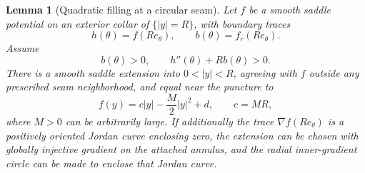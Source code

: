 \documentclass[11pt]{amsart}
\newtheorem{lemma}[theorem]{Lemma}
\theoremstyle{definition}
\theoremstyle{remark}
\numberwithin{equation}{section}
\begin{document}
\begin{lemma}[Quadratic filling at a circular seam]
\label{lem:quadratic-filling}
Let $f$ be a smooth saddle potential on an exterior collar of
$\{|y|=R\}$, with boundary traces
\[
 h(\theta)=f(Re_\theta),\qquad b(\theta)=f_r(Re_\theta).
\]
Assume
\begin{equation}\label{eq:radial-fill-data}
 b(\theta)>0,\qquad h''(\theta)+Rb(\theta)>0.
\end{equation}
There is a smooth saddle extension into $0<|y|<R$, agreeing with $f$
outside any prescribed seam neighborhood, and equal near the puncture to
\begin{equation}\label{eq:quadratic-germ}
 f(y)=c|y|-\frac M2|y|^2+d,\qquad c=MR,
\end{equation}
where $M>0$ can be arbitrarily large. If additionally the trace
$\nabla f(Re_\theta)$ is a positively oriented Jordan curve enclosing
zero, the extension can be chosen with globally injective gradient on
the attached annulus, and the radial inner-gradient circle can be made
to enclose that Jordan curve.
\end{lemma}
\end{document}

